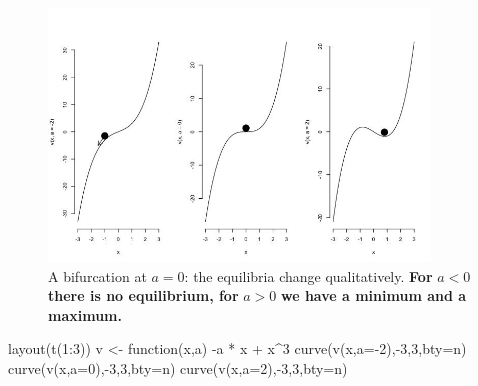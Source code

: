 \documentclass[
  letterpaper,
]{scrbook}
\newenvironment{Shaded}{\begin{snugshade}}{\end{snugshade}}
\newcommand{\AttributeTok}[1]{\textcolor[rgb]{0.40,0.45,0.13}{#1}}
\newcommand{\ControlFlowTok}[1]{\textcolor[rgb]{0.00,0.23,0.31}{#1}}
\newcommand{\DecValTok}[1]{\textcolor[rgb]{0.68,0.00,0.00}{#1}}
\newcommand{\FunctionTok}[1]{\textcolor[rgb]{0.28,0.35,0.67}{#1}}
\newcommand{\NormalTok}[1]{\textcolor[rgb]{0.00,0.23,0.31}{#1}}
\newcommand{\OtherTok}[1]{\textcolor[rgb]{0.00,0.23,0.31}{#1}}
\newcommand{\SpecialCharTok}[1]{\textcolor[rgb]{0.37,0.37,0.37}{#1}}
\newcommand{\StringTok}[1]{\textcolor[rgb]{0.13,0.47,0.30}{#1}}
\begin{document}
\begin{figure}

{\centering \includegraphics[width=3.98596in,height=2.64668in]{media/ch3/image4.jpg}

}

\caption{\label{fig-ch3-img4-old-16}A bifurcation at \(a = 0\): the
equilibria change qualitatively. \textbf{For} \(a<0\) \textbf{there is
no equilibrium, for} \(a>0\) \textbf{we have a minimum and a maximum.}}

\end{figure}

\begin{Shaded}
\begin{Highlighting}[]
\FunctionTok{layout}\NormalTok{(}\FunctionTok{t}\NormalTok{(}\DecValTok{1}\SpecialCharTok{:}\DecValTok{3}\NormalTok{))}
\NormalTok{v }\OtherTok{\textless{}{-}} \ControlFlowTok{function}\NormalTok{(x,a) }\SpecialCharTok{{-}}\NormalTok{a }\SpecialCharTok{*}\NormalTok{ x }\SpecialCharTok{+}\NormalTok{ x}\SpecialCharTok{\^{}}\DecValTok{3} 
\FunctionTok{curve}\NormalTok{(}\FunctionTok{v}\NormalTok{(x,}\AttributeTok{a=}\SpecialCharTok{{-}}\DecValTok{2}\NormalTok{),}\SpecialCharTok{{-}}\DecValTok{3}\NormalTok{,}\DecValTok{3}\NormalTok{,}\AttributeTok{bty=}\StringTok{\textquotesingle{}n\textquotesingle{}}\NormalTok{)}
\FunctionTok{curve}\NormalTok{(}\FunctionTok{v}\NormalTok{(x,}\AttributeTok{a=}\DecValTok{0}\NormalTok{),}\SpecialCharTok{{-}}\DecValTok{3}\NormalTok{,}\DecValTok{3}\NormalTok{,}\AttributeTok{bty=}\StringTok{\textquotesingle{}n\textquotesingle{}}\NormalTok{)}
\FunctionTok{curve}\NormalTok{(}\FunctionTok{v}\NormalTok{(x,}\AttributeTok{a=}\DecValTok{2}\NormalTok{),}\SpecialCharTok{{-}}\DecValTok{3}\NormalTok{,}\DecValTok{3}\NormalTok{,}\AttributeTok{bty=}\StringTok{\textquotesingle{}n\textquotesingle{}}\NormalTok{)}
\end{Highlighting}
\end{Shaded}
\end{document}
